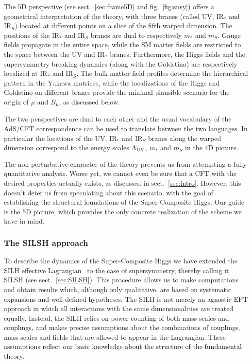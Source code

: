 \documentclass[a4paper,12pt]{article}
\def\fig#1{fig.~\ref{#1}}
\def\fig#1{fig.~\ref{#1}}
\def\sec#1{sect.~\ref{#1}}
\def\LUV{\Lambda_{\rm UV}}
\def\mst{m_*}
\def\mS{m_S}
\begin{document}
{{{{The 5D perspective (see \sec{sec:frame5D} and \fig{fig:susy}) offers a geometrical interpretation of the theory, with three branes (called UV, IR$_*$ and IR$_S$) located at different points on a slice of the fifth warped dimension. The positions of the IR$_*$ and IR$_S$ branes are dual to respectively $\mst$ and $\mS$.
Gauge fields propagate in the entire space, while  the SM matter fields are restricted to the space between the UV and IR$_*$ branes. Furthermore, the Higgs fields and the supersymmetry breaking dynamics (along with the Goldstino) are respectively localized at IR$_*$ and IR$_S$. The bulk matter field profiles determine the hierarchical pattern in the Yukawa matrices, while the localizations of the Higgs and Goldstino on different branes provide the minimal plausible scenario for the origin of $\mu$ and $B_\mu$, as discussed below.

The two perspectives are dual to each other and the usual vocabulary of the AdS/CFT correspondence can be used to translate between the two languages. In particular the locations of the UV, IR$_*$ and IR$_S$ branes along the warped dimension correspond to the energy scales $\LUV$, $\mst$ and $\mS$ in the 4D picture.

The non-perturbative character of the theory prevents us from attempting a fully quantitative analysis. Worse yet, we cannot even be sure that a CFT with the desired properties actually exists, as discussed in \sec{sec:intro}. 
However, this doesn't deter us from speculating about this scenario, with the goal of establishing the structural foundations of the Super-Composite Higgs. Our guide is the 5D picture, which provides the only concrete realization of the scheme we have in mind.

\subsubsection*{The SILSH approach}

To describe the dynamics of the Super-Composite Higgs we have 
extended the SILH effective Lagrangian~\cite{Giudice:2007fh} to the case of supersymmetry, thereby calling it SILSH (see \sec{sec:SILSH}). This procedure allows us to make computations and obtain results which, although only qualitative, are based on systematic expansions and well-defined hypotheses. The SILH is not merely an agnostic EFT approach in which all interactions with the same dimensionalities are treated equally. Instead, the SILH relies on power counting of both mass scales and couplings, and makes precise assumptions about the combinations of couplings, mass scales and fields that are allowed to appear in the Lagrangian. These assumptions reflect our basic knowledge about the structure of the fundamental theory. 

}}}}
\end{document}
